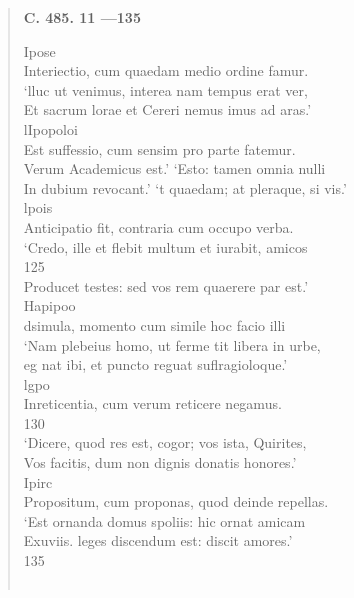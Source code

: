 \documentclass[11pt, a4paper]{report}
\begin{document}
\begin{verse}
     \marginpar{[16]} \begin{center} \textbf{C. 485. 11 —135} \end{center}Ipose \\ Interiectio, cum quaedam medio ordine famur. \\ ‘lluc ut venimus, interea nam tempus erat ver, \\ Et sacrum lorae et Cereri nemus imus ad aras.’ \\ lIpopoloi \\ Est suffessio, cum sensim pro parte fatemur. \\ Verum Academicus est.’ ‘Esto: tamen omnia nulli \\ In dubium revocant.’ ‘t quaedam; at pleraque, si vis.’ \\ lpois \\ Anticipatio fit, contraria cum occupo verba. \\ ‘Credo, ille et flebit multum et iurabit, amicos \\ 125 \\ Producet testes: sed vos rem quaerere par est.’ \\ Hapipoo \\ dsimula, momento cum simile hoc facio illi \\ ‘Nam plebeius homo, ut ferme tit libera in urbe, \\ eg \lbrack nat \rbrack  ibi, et puncto reguat suflragioloque.’ \\ lgpo \\ Inreticentia, cum verum reticere negamus. \\ 130 \\ ‘Dicere, quod res est, cogor; vos ista, Quirites, \\ Vos facitis, dum non dignis donatis honores.’ \\ Ipirc \\ Propositum, cum proponas, quod deinde repellas. \\ ‘Est ornanda domus spoliis: hic ornat amicam \\ Exuviis. leges discendum est: discit amores.’ \\ 135 \\ 
        ﻿\pagebreak 

\end{verse}
\end{document}
